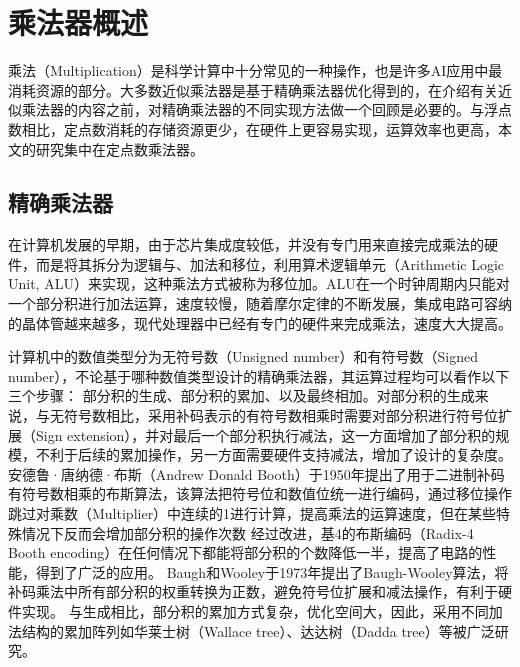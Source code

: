 \chapter{乘法器概述}

乘法（Multiplication）是科学计算中十分常见的一种操作，也是许多AI应用中最消耗资源的部分\cite{AC:AM:Overfit}。大多数近似乘法器是基于精确乘法器优化得到的，在介绍有关近似乘法器的内容之前，对精确乘法器的不同实现方法做一个回顾是必要的。与浮点数相比，定点数消耗的存储资源更少，在硬件上更容易实现，运算效率也更高，本文的研究集中在定点数乘法器。

\section{精确乘法器} \label{精确乘法器}

在计算机发展的早期，由于芯片集成度较低，并没有专门用来直接完成乘法的硬件，而是将其拆分为逻辑与、加法和移位，利用算术逻辑单元（Arithmetic Logic Unit, ALU）来实现，这种乘法方式被称为移位加\cite{计算机体系结构基础}。ALU在一个时钟周期内只能对一个部分积进行加法运算，速度较慢，随着摩尔定律的不断发展，集成电路可容纳的晶体管越来越多，现代处理器中已经有专门的硬件来完成乘法，速度大大提高。

计算机中的数值类型分为无符号数（Unsigned number）和有符号数（Signed number），不论基于哪种数值类型设计的精确乘法器，其运算过程均可以看作以下三个步骤： 部分积的生成、部分积的累加、以及最终相加。对部分积的生成来说，与无符号数相比，采用补码表示的有符号数相乘时需要对部分积进行符号位扩展（Sign extension），并对最后一个部分积执行减法，这一方面增加了部分积的规模，不利于后续的累加操作，另一方面需要硬件支持减法，增加了设计的复杂度。
安德鲁·唐纳德·布斯（Andrew Donald Booth）于1950年提出了用于二进制补码有符号数相乘的布斯算法\cite{EM:booth_orig}，该算法把符号位和数值位统一进行编码，通过移位操作跳过对乘数（Multiplier）中连续的1进行计算，提高乘法的运算速度，但在某些特殊情况下反而会增加部分积的操作次数%
经过改进，基4的布斯编码（Radix-4 Booth encoding）在任何情况下都能将部分积的个数降低一半\cite{EM:booth_Macsorley,EM:booth_proof}，提高了电路的性能，得到了广泛的应用。
Baugh和Wooley于1973年提出了Baugh-Wooley算法\cite{EM:baugh-wooley}，将补码乘法中所有部分积的权重转换为正数，避免符号位扩展和减法操作，有利于硬件实现。
与生成相比，部分积的累加方式复杂，优化空间大，因此，采用不同加法结构的累加阵列如华莱士树（Wallace tree）\cite{EM:Wallace}、达达树（Dadda tree）\cite{EM:Dadda}等被广泛研究。

